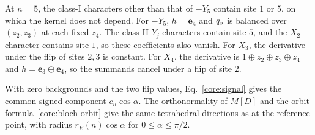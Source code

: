 At $n=5$, the class-I characters other than that of $-Y_5$ contain site $1$ or $5$, on which the kernel does not depend. For $-Y_5$, $h=\mathbf e_4$ and $q_{\rm o}$ is balanced over $(z_2,z_3)$ at each fixed $z_4$. The class-II $Y_j$ characters contain site $5$, and the $X_2$ character contains site $1$, so these coefficients also vanish. For $X_3$, the derivative under the flip of sites $2,3$ is constant. For $X_4$, the derivative is $1\oplus z_2\oplus z_3\oplus z_4$ and $h=\mathbf e_3\oplus\mathbf e_4$, so the summands cancel under a flip of site $2$.

With zero backgrounds and the two flip values, Eq.~\eqref{core:signal} gives the common signed component $c_n\cos\alpha$. The orthonormality of $M[D]$ and the orbit formula~\eqref{core:bloch-orbit} give the same tetrahedral directions as at the reference point, with radius $r_E(n)\cos\alpha$ for $0\le\alpha\le\pi/2$.
